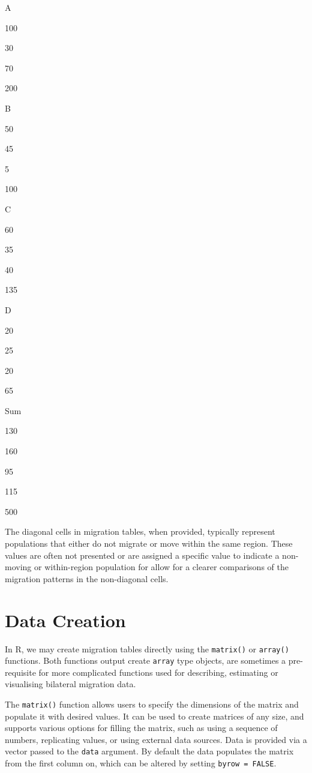 \documentclass[
]{book}
\begin{document}
A

100

30

70

200

B

50

45

5

100

C

60

35

40

135

D

20

25

20

65

Sum

130

160

95

115

500

The diagonal cells in migration tables, when provided, typically represent populations that either do not migrate or move within the same region. These values are often not presented or are assigned a specific value to indicate a non-moving or within-region population for allow for a clearer comparisons of the migration patterns in the non-diagonal cells.

\hypertarget{data-creation}{%
\section{Data Creation}\label{data-creation}}

In R, we may create migration tables directly using the \texttt{matrix()} or \texttt{array()} functions. Both functions output create \texttt{array} type objects, are sometimes a pre-requisite for more complicated functions used for describing, estimating or visualising bilateral migration data.

The \texttt{matrix()} function allows users to specify the dimensions of the matrix and populate it with desired values. It can be used to create matrices of any size, and supports various options for filling the matrix, such as using a sequence of numbers, replicating values, or using external data sources. Data is provided via a vector passed to the \texttt{data} argument. By default the data populates the matrix from the first column on, which can be altered by setting \texttt{byrow\ =\ FALSE}.
\end{document}
